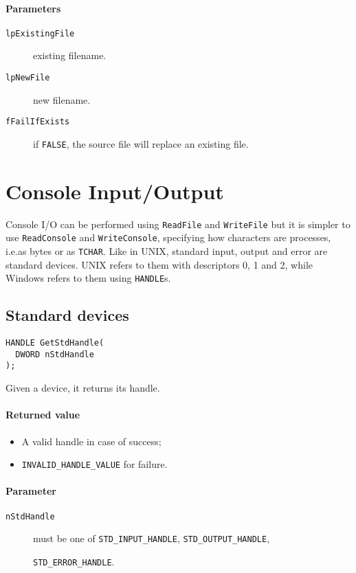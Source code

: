 \paragraph{Parameters}
\begin{description}
\item [\texttt{lpExistingFile}] existing filename.
\item [\texttt{lpNewFile}] new filename.
\item [\texttt{fFailIfExists}] if \texttt{FALSE}, the source file will replace an existing file.
\end{description}

\section{Console Input/Output}
Console I/O can be performed using \texttt{ReadFile} and \texttt{WriteFile} but it is simpler to use \texttt{ReadConsole} and \texttt{WriteConsole}, specifying how characters are processes, i.e.\@ as bytes or as \texttt{TCHAR}. Like in UNIX, standard input, output and error are standard devices. UNIX refers to them with descriptors 0, 1 and 2, while Windows refers to them using \texttt{HANDLE}s.

\subsection{Standard devices}
\begin{verbatim}
HANDLE GetStdHandle(
  DWORD nStdHandle
);
\end{verbatim}

Given a device, it returns its handle.

\paragraph{Returned value}
\begin{itemize}
\item A valid handle in case of success;
\item \texttt{INVALID\_HANDLE\_VALUE} for failure.
\end{itemize}

\paragraph{Parameter}
\begin{description}
\item [\texttt{nStdHandle}] must be one of \texttt{STD\_INPUT\_HANDLE}, \texttt{STD\_OUTPUT\_HANDLE},

\texttt{STD\_ERROR\_HANDLE}.
\end{description}

